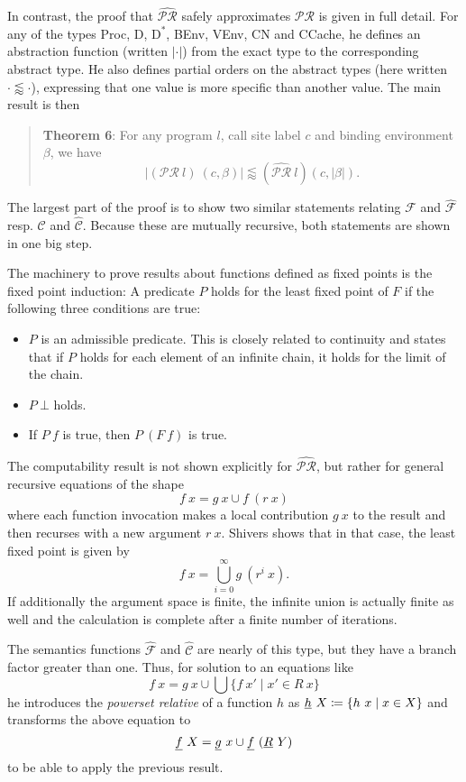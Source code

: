 \documentclass[a4paper,parskip=half,BCOR=8mm,DIV=calc,12pt]{scrbook}
\newcommand{\C}{\mathcal C}
\newcommand{\F}{\mathcal F}
\newcommand{\PR}{\mathcal {PR}}
\newcommand{\aC}{\widehat{\mathcal C}}
\newcommand{\aF}{\widehat{\mathcal F}}
\newcommand{\aPR}{\widehat{\mathcal {PR}}}
\begin{document}
In contrast, the proof that $\aPR$ safely approximates $\PR$ is given in full detail. For any of the types Proc, D, $\text{D}^*$, BEnv, VEnv, CN and CCache, he defines an abstraction function (written $|\cdot|$) from the exact type to the corresponding abstract type. He also defines partial orders on the abstract types (here written $\cdot \lessapprox \cdot$), expressing that one value is more specific than another value. The main result is then
\begin{quote}
\textbf{Theorem 6}: For any program $l$, call site label $c$ and binding environment $\beta$, we have
\[
|(\PR\ l)\ (c,\beta)| \lessapprox (\aPR\ l) (c,|\beta|).
\]
\end{quote}
The largest part of the proof is to show two similar statements relating $\F$ and $\aF$ resp. $\C$ and $\aC$. Because these are mutually recursive, both statements are shown in one big step.

The machinery to prove results about functions defined as fixed points is the fixed point induction: A predicate $P$ holds for the least fixed point of $F$ if the following three conditions are true:\label{fixedpointinduction}
\begin{itemize}
\item $P$ is an admissible predicate. This is closely related to continuity and states that if $P$ holds for each element of an infinite chain, it holds for the limit of the chain.
\item $P\ \bot$ holds.
\item If $P\ f$ is true, then $P\ (F\ f)$ is true.
\end{itemize}

\label{shiverscomputabilty}The computability result is not shown explicitly for $\aPR$, but rather for general recursive equations of the shape
\[
f\ x = g\ x \cup f\ (r\ x)
\]
where each function invocation makes a local contribution $g\ x$ to the result and then recurses with a new argument $r\ x$. Shivers shows that in that case, the least fixed point is given by
\[
f\ x = \bigcup_{i=0}^\infty g\ (r^i\ x).
\]
If additionally the argument space is finite, the infinite union is actually finite as well and the calculation is complete after a finite number of iterations.

The semantics functions $\aF$ and $\aC$ are nearly of this type, but they have a branch factor greater than one. Thus, for solution to an equations like
\[
f\ x = g\ x \cup \bigcup\{f\ x' \mid x' \in R\ x\}
\]
he introduces the \textit{powerset relative} of a function $h$ as $\uline h\ X\coloneqq \{h\ x \mid x\in X\}$ and transforms the above equation to 
\[
\uline f\ X = \uline g\ x \cup \uline f\ (\uline R\ Y)
\]
to be able to apply the previous result.
\end{document}
